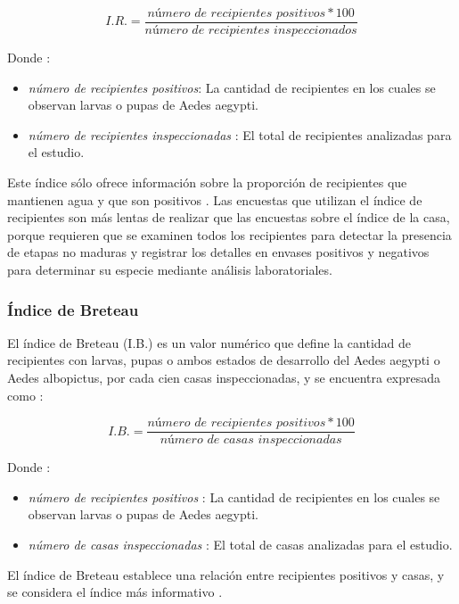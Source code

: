 \begin{equation}
I.R. = \frac{\textit{número de recipientes positivos} * 100}{\textit{número de recipientes inspeccionados}}
\end{equation}

Donde :
\begin{itemize}
\item \textit{número de recipientes positivos}: La cantidad de recipientes en los cuales se observan larvas o pupas de Aedes aegypti.
\item \textit{número de recipientes inspeccionadas} : El total de recipientes analizadas para el estudio.
\end{itemize}

Este índice sólo ofrece información sobre la proporción de recipientes que mantienen agua y que
son positivos \cite{world2009dengue}. Las encuestas que utilizan el índice de recipientes son más
lentas de realizar que las encuestas sobre el índice de la casa, porque requieren que se
examinen todos los recipientes para detectar la presencia de etapas no maduras y registrar los
detalles en envases positivos y negativos para determinar su especie mediante análisis
laboratoriales.

\subsubsection{Índice de Breteau}
El índice de Breteau (I.B.) es un valor numérico que define la cantidad de recipientes con
larvas, pupas o ambos estados de desarrollo del Aedes aegypti o Aedes albopictus, por cada cien
casas inspeccionadas\cite{ibanez1995vectores, MARQUES1993,world2009dengue}, y se encuentra
expresada como :

\begin{equation}
I.B. = \frac{\textit{número de recipientes positivos} * 100}{\textit{número de casas inspeccionadas}}
\end{equation}

Donde :
\begin{itemize}
\item \textit{número de recipientes positivos} : La cantidad de recipientes en los cuales se observan larvas o pupas de Aedes aegypti.
\item \textit{número de casas inspeccionadas} : El total de casas analizadas para el estudio.
\end{itemize}

El índice de Breteau establece una relación entre recipientes positivos y casas, y se considera el
índice más informativo \cite{world2009dengue}.

